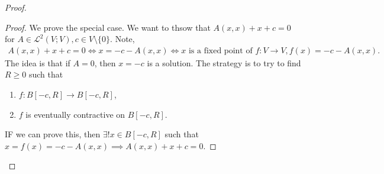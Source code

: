 \documentclass{report}
\begin{document}
{\begin{proof}
        \begin{proof}
            We prove the special case. We want to thsow that $A(x, x) + x + c = 0$ for $A \in \mathcal L^2(V; V), c \in  V \setminus \{0 \}$. Note,
            \begin{align*}
                A(x, x) + x + c = 0 \iff x = -c - A(x, x) \iff x \text{ is a fixed point of } f : V \to V, f(x) = -c - A(x, x).
            \end{align*}
            The idea is that if $A= 0$, then $x = -c$ is a solution. The strategy is to try to find $R \geq 0$ such that
            \begin{enumerate}
                \item $f: B[-c, R] \to B[-c, R]$,
                \item $f$ is eventually contractive on $B[-c, R]$.
            \end{enumerate}
            IF we can prove this, then $\exists ! x \in B[-c, R]$ such that $x = f(x) = -c - A(x, x) \implies A(x, x) + x + c = 0$.
        \end{proof}
    \end{proof}
    }
\end{document}
